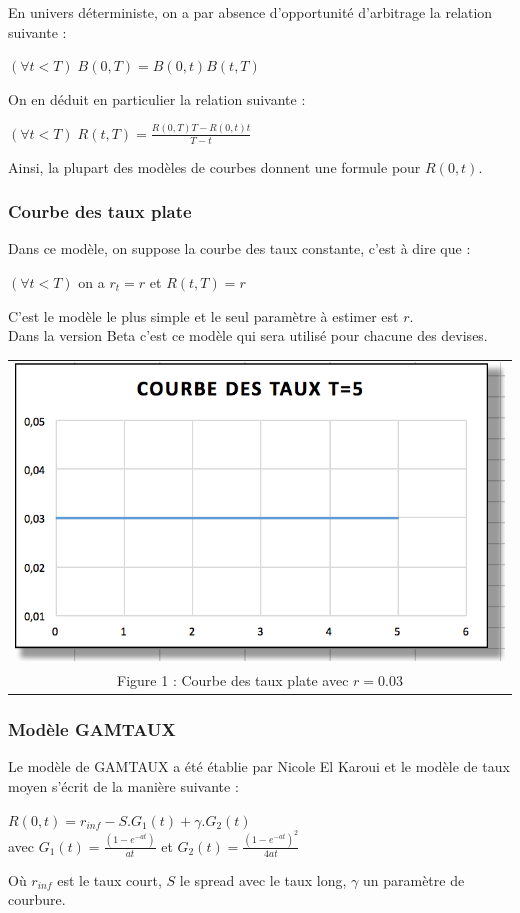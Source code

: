 \documentclass[a4paper,12pt]{article}
\begin{document}
En univers déterministe, on a par absence d'opportunité d'arbitrage la relation suivante : 
\begin{center}
$\left(\forall t<T\right)\;B(0,T)=B(0,t)B(t,T)$
\end{center}
On en déduit en particulier la relation suivante : 
\begin{center}
$\left(\forall t<T\right)\;R(t,T)=\frac{R(0,T)T-R(0,t)t}{T-t}$
\end{center}
Ainsi, la plupart des modèles de courbes donnent une formule pour $R(0,t)$.
\subsubsection{Courbe des taux plate}
Dans ce modèle, on suppose la courbe des taux constante, c'est à dire que :
\begin{center}
$\left(\forall t<T\right)$ on a $r_t = r$ et $R(t,T)=r$
\end{center}

C'est le modèle le plus simple et le seul paramètre à estimer est $r$. \\
Dans la version Beta c'est ce modèle qui sera utilisé pour chacune des devises. \\[2mm]
\begin{center}
\begin{tabular}{c}
\includegraphics[scale=0.7]{constR} \\
Figure 1 : Courbe des taux plate avec $r=0.03$
\end{tabular}
\end{center}
\newpage
\subsubsection{Modèle GAMTAUX}
Le modèle de {\sf GAMTAUX} a été établie par Nicole El Karoui et le modèle de taux moyen s'écrit de la manière suivante : 
\begin{center}
$R(0,t)=r_{inf} - S.G_1(t) + \gamma.G_2(t)$ \\[2mm] 
avec $G_1(t)=\frac{\left(1-e^{-at}\right)}{at}$ et $G_2(t)=\frac{\left(1-e^{-at}\right)^2}{4at}$
\end{center}
Où $r_{inf}$ est le taux court, $S$ le spread avec le taux long, $\gamma$ un paramètre de courbure. \\
\end{document}
